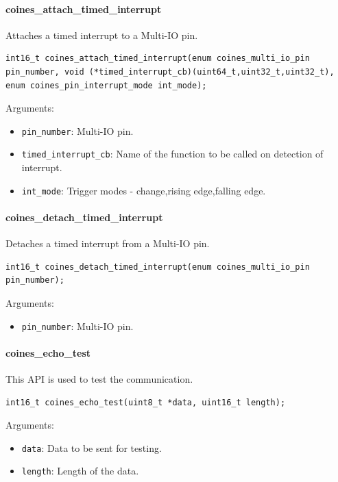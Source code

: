 \paragraph{coines\_attach\_timed\_interrupt}
Attaches a timed interrupt to a Multi-IO pin.

\begin{lstlisting}
int16_t coines_attach_timed_interrupt(enum coines_multi_io_pin pin_number, void (*timed_interrupt_cb)(uint64_t,uint32_t,uint32_t), enum coines_pin_interrupt_mode int_mode);
\end{lstlisting}

Arguments:
\begin{itemize}
	\item \texttt{pin\_number}: Multi-IO pin.
	\item \texttt{timed\_interrupt\_cb}: Name of the function to be called on detection of interrupt.
	\item \texttt{int\_mode}: Trigger modes - change,rising edge,falling edge.
\end{itemize}

\paragraph{coines\_detach\_timed\_interrupt}
Detaches a timed interrupt from a Multi-IO pin.

\begin{lstlisting}
int16_t coines_detach_timed_interrupt(enum coines_multi_io_pin pin_number);
\end{lstlisting}

Arguments:
\begin{itemize}
	\item \texttt{pin\_number}: Multi-IO pin.
\end{itemize}

\paragraph{coines\_echo\_test}
This API is used to test the communication.

\begin{lstlisting}
int16_t coines_echo_test(uint8_t *data, uint16_t length);
\end{lstlisting}

Arguments:
\begin{itemize}
	\item \texttt{data}: Data to be sent for testing.
	\item \texttt{length}: Length of the data.
\end{itemize}

